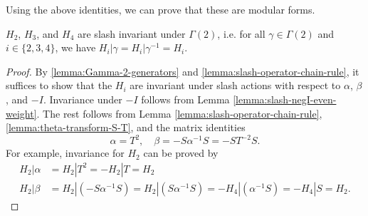 Using the above identities, we can prove that these are modular forms.
\begin{lemma}\label{lemma:theta-slash-invariant}\leanok
  $H_{2}$, $H_{3}$, and $H_{4}$ are slash invariant under $\Gamma(2)$, i.e. for all $\gamma \in \Gamma(2)$ and $i \in \{2, 3, 4\}$, we have $H_i|\gamma = H_i|\gamma^{-1} = H_i$.
\end{lemma}
\begin{proof}\leanok
  By \cref{lemma:Gamma-2-generators} and \cref{lemma:slash-operator-chain-rule}, it suffices to show that the $H_i$ are invariant under slash actions with respect to $\alpha$, $\beta$, and $-I$.
Invariance under $-I$ follows from Lemma \ref{lemma:slash-negI-even-weight}.
The rest follows from Lemma \ref{lemma:slash-operator-chain-rule}, \ref{lemma:theta-transform-S-T}, and the matrix identities
\begin{equation}
    \alpha = T^2, \quad \beta = -S\alpha^{-1}S = -ST^{-2}S. \label{eqn:matrix}
\end{equation}
For example, invariance for $H_2$ can be proved by
\begin{align}
    H_2|\alpha &= H_2 |T^{2} = -H_2 |T = H_2 \\
    H_2|\beta &= H_2 |(-S\alpha^{-1}S) = H_2 | (S\alpha^{-1}S) =-H_4 |(\alpha^{-1}S) = -H_4 |S  = H_2.
\end{align}
\end{proof}

